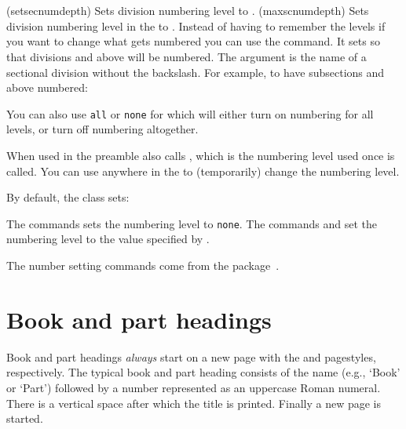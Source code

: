\begin{syntax}
\cmd{\setsecnumdepth} \\
\cmd{\maxsecnumdepth} \\
\end{syntax}
\glossary(setsecnumdepth)%
  {}%
  {Sets division numbering level to .}
\glossary(maxscnumdepth)%
  {}%
  {Sets division numbering level in the  to .}
Instead of having to remember the levels if you want to change what
gets numbered you can use the \cmd{\setsecnumdepth} command. It
sets  so that divisions  and above
will be numbered. The argument  is the name of a sectional
division without the backslash. For example, to have subsections
and above numbered:
\begin{lcode}
\end{lcode}
You can also use \texttt{all} or \texttt{none} for  which
will either turn on numbering for all levels, or turn off numbering
altogether.

When used in the preamble \cmd{\setsecnumdepth} also
calls \cmd{\maxsecnumdepth}, which is the numbering level used once
\cmd{\mainmatter} is called. You can use \cmd{\setsecnumdepth} anywhere
in the \cmd{\mainmatter} to (temporarily) change the numbering level.

    By default, the class sets:
\begin{lcode}
\end{lcode}
The \cmd{\frontmatter} commands sets the numbering level to \texttt{none}.
The commands \cmd{\mainmatter} and \cmd{\mainmatter*} set the
numbering level to the value specified by \cmd{\maxsecnumdepth}.

    The number setting commands come from the 
package~\cite{TOCVSEC2}.

\section{Book and part headings}


    Book and part headings \emph{always} start on a new page with the 
 and  pagestyles, respectively. The typical
book and part heading consists of the name (e.g., `Book' or `Part') 
followed by a number represented as an uppercase Roman numeral. There is 
a vertical space after which the title is printed. Finally a new page is
started.

